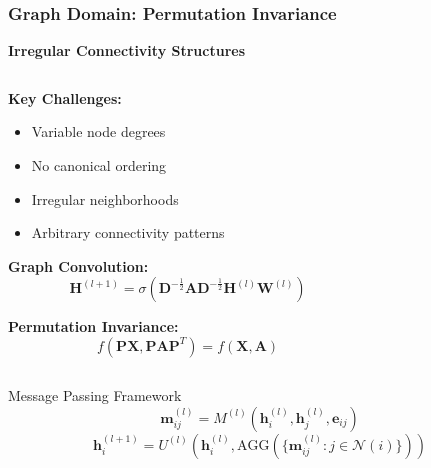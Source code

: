 \begin{frame}[fragile]\frametitle{Graph Domain: Permutation Invariance}

\begin{center}
\textbf{Irregular Connectivity Structures}
\end{center}

\begin{columns}
\begin{column}{0.6\textwidth}
\textbf{Key Challenges:}
\begin{itemize}
\item Variable node degrees
\item No canonical ordering
\item Irregular neighborhoods
\item Arbitrary connectivity patterns
\end{itemize}

\vspace{0.5cm}
\textbf{Graph Convolution:}
$$\mathbf{H}^{(l+1)} = \sigma\left(\mathbf{D}^{-\frac{1}{2}}\mathbf{A}\mathbf{D}^{-\frac{1}{2}}\mathbf{H}^{(l)}\mathbf{W}^{(l)}\right)$$

\textbf{Permutation Invariance:}
$$f(\mathbf{P}\mathbf{X}, \mathbf{P}\mathbf{A}\mathbf{P}^T) = f(\mathbf{X}, \mathbf{A})$$
\end{column}
\begin{column}{0.4\textwidth}

\end{column}
\end{columns}

\begin{exampleblock}{Message Passing Framework}
$$\mathbf{m}_{ij}^{(l)} = M^{(l)}(\mathbf{h}_i^{(l)}, \mathbf{h}_j^{(l)}, \mathbf{e}_{ij})$$
$$\mathbf{h}_i^{(l+1)} = U^{(l)}\left(\mathbf{h}_i^{(l)}, \text{AGG}\left(\{\mathbf{m}_{ij}^{(l)} : j \in \mathcal{N}(i)\}\right)\right)$$
\end{exampleblock}

\end{frame}

